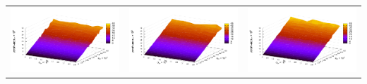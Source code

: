 \documentclass[12pt,a4paper]{article}
\theoremstyle{definition}
\begin{document}
\begin{table}[h]
\begin{tabular}{c c c}
	\includegraphics[scale=0.4]{figs/all/p1.txt_coeff1.dat.pdf} & \includegraphics[scale=0.4]{figs/all/p2.txt_coeff1.dat.pdf} & \includegraphics[scale=0.4]{figs/all/p3.txt_coeff1.dat.pdf} \\

\end{tabular}
\end{table}
\end{document}

